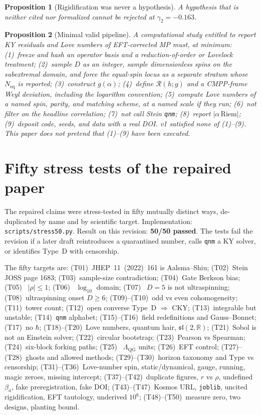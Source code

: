 \documentclass[11pt,a4paper]{article}
\newtheorem{proposition}{Proposition}[section]
\begin{document}
\begin{proposition}[Rigidification was never a hypothesis]
A hypothesis that is neither cited nor formalized cannot be rejected at
\(\gamma_2=-0.163\).
\end{proposition}

\begin{proposition}[Minimal valid pipeline]
\label{prop:pipeline}
A computational study entitled to report KY residuals and Love numbers
of EFT-corrected MP must, at minimum: (1)~freeze and hash an operator
basis and a reduction-of-order or Lovelock treatment; (2)~sample \(D\)
as an integer, sample dimensionless spins on the subextremal domain, and
force the equal-spin locus as a separate stratum whose \(N_{\mathrm{eq}}\)
is reported; (3)~construct \(g(\alpha)\); (4)~define
\(\mathcal{R}(h;g)\) and a CMPP-frame Weyl deviation, including the
logarithm convention; (5)~compute Love numbers of a named spin, parity,
and matching scheme, at a named scale if they run; (6)~not filter on
the headline correlation; (7)~not call Stein \texttt{qnm};
(8)~report \(|\alpha\,\mathrm{Riem}|\); (9)~deposit code, seeds, and
data with a real DOI. v1 satisfied none of (1)--(9). This paper does
not pretend that (1)--(9) have been executed.
\end{proposition}

\section{Fifty stress tests of the repaired paper}

The repaired claims were stress-tested in fifty mutually distinct ways,
de-duplicated by name and by scientific target. Implementation:
\texttt{scripts/stress50.py}. Result on this revision:
\textbf{50/50 passed}. The tests fail the revision if a later draft
reintroduces a quarantined number, calls \texttt{qnm} a KY solver, or
identifies Type~D with censorship.

The fifty targets are: (T01)~JHEP~11~(2022)~161 is Aalsma--Shiu;
(T02)~Stein JOSS page 1683; (T03)~sample-size contradiction;
(T04)~Gate Berkson bias; (T05)~ \(|\rho|\le1\); (T06)~ \(\log_{10}\)
domain; (T07)~ \(D=5\) is not ultraspinning; (T08)~ultraspinning onset
\(D\ge6\); (T09)--(T10)~odd vs even cohomogeneity; (T11)~tower count;
(T12)~open converse Type~D \(\Rightarrow\) CKY; (T13)~integrable but
unstable; (T14)~\texttt{qnm} alphabet; (T15)--(T16)~field redefinitions
and Gauss--Bonnet; (T17)~no \(\hbar\); (T18)--(T20)~Love numbers,
quantum hair, \(\mathfrak{sl}(2,\mathbb{R})\); (T21)~Sobol is not an
Einstein solver; (T22)~circular bootstrap; (T23)~Pearson vs Spearman;
(T24)~six-block forking paths; (T25)~ \(\Lambda_{\mathrm{QG}}\) units;
(T26)~EFT control; (T27)--(T28)~ghosts and allowed methods;
(T29)--(T30)~horizon taxonomy and Type vs censorship;
(T31)--(T36)~Love-number spin, static/dynamical, gauge, running, magic
zeroes, missing intercept; (T37)--(T42)~duplicate figures, \(r\) vs
\(\rho\), undefined \(\beta_a\), fake preregistration, fake DOI;
(T43)--(T47)~Kosmos URL, \texttt{joblib}, uncited rigidification, EFT
tautology, underived \(10^6\); (T48)--(T50)~measure zero, two designs,
planting bound.
\end{document}
